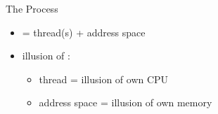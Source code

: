 \begin{frame}{The Process}
\begin{itemize}
\item {} = thread(s) + address space
\item illusion of :
\begin{itemize}
\item thread = illusion of own CPU
\item address space = illusion of own memory
\end{itemize}
\end{itemize}
\end{frame}

